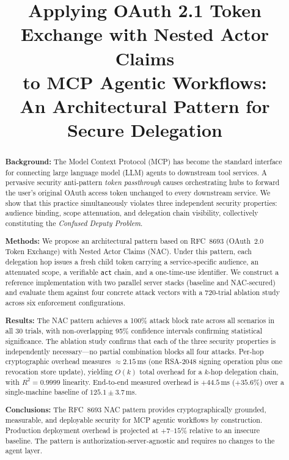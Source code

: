 \documentclass[journal]{IEEEtran}
\begin{document}
\title{Applying OAuth 2.1 Token Exchange with Nested Actor Claims\\
to MCP Agentic Workflows:\\
An Architectural Pattern for Secure Delegation}

\author{
}

\maketitle

\begin{abstract}
\textbf{Background:}
The Model Context Protocol (MCP) has become the standard interface for connecting
large language model (LLM) agents to downstream tool services. A pervasive
security anti-pattern \textit{token passthrough} causes orchestrating hubs to
forward the user's original OAuth access token unchanged to every downstream
service. We show that this practice simultaneously violates three independent
security properties: audience binding, scope attenuation, and delegation chain
visibility, collectively constituting the \textit{Confused Deputy Problem}.

\textbf{Methods:}
We propose an architectural pattern based on RFC~8693 (OAuth~2.0 Token Exchange)
with Nested Actor Claims (NAC). Under this pattern, each delegation hop issues a
fresh child token carrying a service-specific audience, an attenuated scope, a
verifiable \texttt{act} chain, and a one-time-use identifier. We construct a
reference implementation with two parallel server stacks (baseline and NAC-secured)
and evaluate them against four concrete attack vectors with a 720-trial ablation
study across six enforcement configurations.

\textbf{Results:}
The NAC pattern achieves a 100\% attack block rate across all scenarios in all
30 trials, with non-overlapping 95\% confidence intervals confirming statistical
significance. The ablation study confirms that each of the three security
properties is independently necessary---no partial combination blocks all four
attacks. Per-hop cryptographic overhead measures $\approx 2.15$\,ms (one
RSA-2048 signing operation plus one revocation store update), yielding $O(k)$
total overhead for a $k$-hop delegation chain, with $R^2 = 0.9999$ linearity.
End-to-end measured overhead is $+44.5$\,ms ($+35.6\%$) over a single-machine
baseline of $125.1 \pm 3.7$\,ms.

\textbf{Conclusions:}
The RFC~8693 NAC pattern provides cryptographically grounded, measurable, and
deployable security for MCP agentic workflows by construction. Production
deployment overhead is projected at $+7$--$15\%$ relative to an insecure
baseline. The pattern is authorization-server-agnostic and requires no changes
to the agent layer.
\end{abstract}
\end{document}
